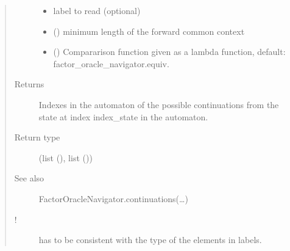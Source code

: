 \documentclass[letterpaper,10pt,english]{sphinxmanual}
\begin{document}
\begin{fulllineitems}
\begin{fulllineitems}
\begin{quote}
\begin{description}
\begin{itemize}
\item {} 
 \textendash{} label to read (optional)

\item {} 
 () \textendash{} minimum length of the forward common context

\item {} 
 () \textendash{} Compararison function given as a lambda function, default: factor\_oracle\_navigator.equiv.

\end{itemize}

\item[{Returns}] \leavevmode
Indexes in the automaton of the possible continuations from the state at index index\_state in the automaton.

\item[{Return type}] \leavevmode
{}(list (), list ())

\item[{See also}] \leavevmode
FactorOracleNavigator.continuations(…)

\item[{!}] \leavevmode
{} has to be consistent with the type of the elements in labels.

\end{description}\end{quote}

\end{fulllineitems}



\end{fulllineitems}
\end{document}
